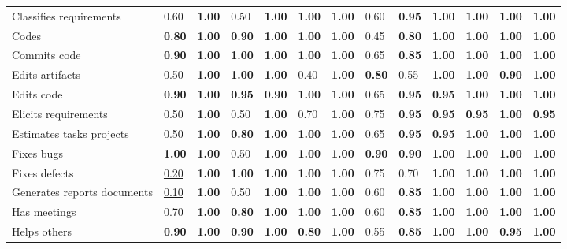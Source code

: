 \begin{tabular}{lllllllllllll}
Classifies requirements & 0.60 & \textbf{1.00} & 0.50 & \textbf{1.00} & \textbf{1.00} & \textbf{1.00} & 0.60 & \textbf{0.95} & \textbf{1.00} & \textbf{1.00} & \textbf{1.00} & \textbf{1.00} \\
Codes & \textbf{0.80} & \textbf{1.00} & \textbf{0.90} & \textbf{1.00} & \textbf{1.00} & \textbf{1.00} & 0.45 & \textbf{0.80} & \textbf{1.00} & \textbf{1.00} & \textbf{1.00} & \textbf{1.00} \\
Commits code & \textbf{0.90} & \textbf{1.00} & \textbf{1.00} & \textbf{1.00} & \textbf{1.00} & \textbf{1.00} & 0.65 & \textbf{0.85} & \textbf{1.00} & \textbf{1.00} & \textbf{1.00} & \textbf{1.00} \\
Edits artifacts & 0.50 & \textbf{1.00} & \textbf{1.00} & \textbf{1.00} & 0.40 & \textbf{1.00} & \textbf{0.80} & 0.55 & \textbf{1.00} & \textbf{1.00} & \textbf{0.90} & \textbf{1.00} \\
Edits code & \textbf{0.90} & \textbf{1.00} & \textbf{0.95} & \textbf{0.90} & \textbf{1.00} & \textbf{1.00} & 0.65 & \textbf{0.95} & \textbf{0.95} & \textbf{1.00} & \textbf{1.00} & \textbf{1.00} \\
Elicits requirements & 0.50 & \textbf{1.00} & 0.50 & \textbf{1.00} & 0.70 & \textbf{1.00} & 0.75 & \textbf{0.95} & \textbf{0.95} & \textbf{0.95} & \textbf{1.00} & \textbf{0.95} \\
Estimates tasks projects & 0.50 & \textbf{1.00} & \textbf{0.80} & \textbf{1.00} & \textbf{1.00} & \textbf{1.00} & 0.65 & \textbf{0.95} & \textbf{0.95} & \textbf{1.00} & \textbf{1.00} & \textbf{1.00} \\
Fixes bugs & \textbf{1.00} & \textbf{1.00} & 0.50 & \textbf{1.00} & \textbf{1.00} & \textbf{1.00} & \textbf{0.90} & \textbf{0.90} & \textbf{1.00} & \textbf{1.00} & \textbf{1.00} & \textbf{1.00} \\
Fixes defects & \underline{0.20} & \textbf{1.00} & \textbf{1.00} & \textbf{1.00} & \textbf{1.00} & \textbf{1.00} & 0.75 & 0.70 & \textbf{1.00} & \textbf{1.00} & \textbf{1.00} & \textbf{1.00} \\
Generates reports documents & \underline{0.10} & \textbf{1.00} & 0.50 & \textbf{1.00} & \textbf{1.00} & \textbf{1.00} & 0.60 & \textbf{0.85} & \textbf{1.00} & \textbf{1.00} & \textbf{1.00} & \textbf{1.00} \\
Has meetings & 0.70 & \textbf{1.00} & \textbf{0.80} & \textbf{1.00} & \textbf{1.00} & \textbf{1.00} & 0.60 & \textbf{0.85} & \textbf{1.00} & \textbf{1.00} & \textbf{1.00} & \textbf{1.00} \\
Helps others & \textbf{0.90} & \textbf{1.00} & \textbf{0.90} & \textbf{1.00} & \textbf{0.80} & \textbf{1.00} & 0.55 & \textbf{0.85} & \textbf{1.00} & \textbf{1.00} & \textbf{0.95} & \textbf{1.00} \\

\end{tabular}
